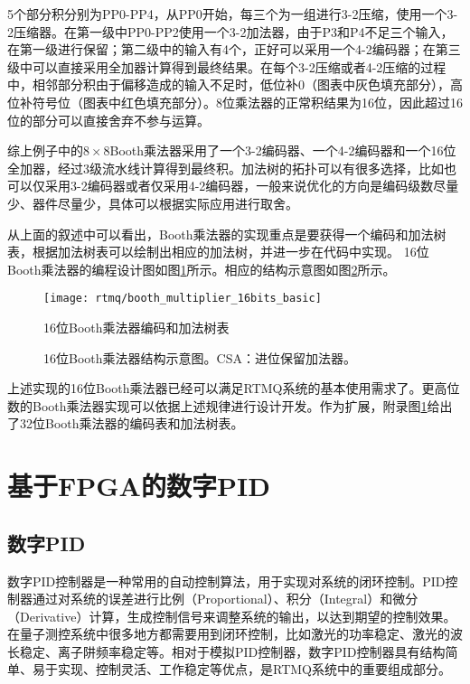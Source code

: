5个部分积分别为PP0-PP4，从PP0开始，每三个为一组进行3-2压缩，使用一个3-2压缩器。在第一级中PP0-PP2使用一个3-2加法器，由于P3和P4不足三个输入，在第一级进行保留；第二级中的输入有4个，正好可以采用一个4-2编码器；在第三级中可以直接采用全加器计算得到最终结果。在每个3-2压缩或者4-2压缩的过程中，相邻部分积由于偏移造成的输入不足时，低位补0（图表中灰色填充部分），高位补符号位（图表中红色填充部分）。8位乘法器的正常积结果为16位，因此超过16位的部分可以直接舍弃不参与运算。

综上例子中的$8\times 8$Booth乘法器采用了一个3-2编码器、一个4-2编码器和一个16位全加器，经过3级流水线计算得到最终积。加法树的拓扑可以有很多选择，比如也可以仅采用3-2编码器或者仅采用4-2编码器，一般来说优化的方向是编码级数尽量少、器件尽量少，具体可以根据实际应用进行取舍。

从上面的叙述中可以看出，Booth乘法器的实现重点是要获得一个编码和加法树表，根据加法树表可以绘制出相应的加法树，并进一步在代码中实现。
16位Booth乘法器的编程设计图如图\ref{fig:booth_multiplier_16bits_basic}所示。相应的结构示意图如图\ref{fig:booth_multiplier_16bits_basic_s}所示。
\begin{figure}
    \centering
    \caption[16位Booth乘法器编码和加法树表]{16位Booth乘法器编码和加法树表\label{fig:booth_multiplier_16bits_basic}}
    \texttt{[image: rtmq/booth\_multiplier\_16bits\_basic]}
\end{figure}

\begin{figure}
    \centering
    \caption[16位Booth乘法器结构示意图]{16位Booth乘法器结构示意图。CSA：进位保留加法器。\label{fig:booth_multiplier_16bits_basic_s}}
    
\end{figure}

上述实现的16位Booth乘法器已经可以满足RTMQ系统的基本使用需求了。更高位数的Booth乘法器实现可以依据上述规律进行设计开发。作为扩展，附录图\ref{fig:booth_multiplier_16bits_basic}给出了32位Booth乘法器的编码表和加法树表。









\newpage
\section[基于FPGA的数字PID]{基于FPGA的数字PID\label{section:digital_pid}}
\subsection[数字PID]{数字PID}
数字PID控制器是一种常用的自动控制算法，用于实现对系统的闭环控制。PID控制器通过对系统的误差进行比例（Proportional）、积分（Integral）和微分（Derivative）计算，生成控制信号来调整系统的输出，以达到期望的控制效果。在量子测控系统中很多地方都需要用到闭环控制，比如激光的功率稳定、激光的波长稳定、离子阱频率稳定等。相对于模拟PID控制器，数字PID控制器具有结构简单、易于实现、控制灵活、工作稳定等优点，是RTMQ系统中的重要组成部分。

